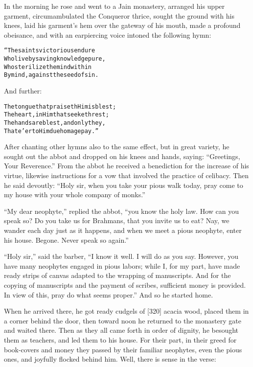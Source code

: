\documentclass{article}
\renewenvironment{verbatim}{\begin{alltt}\normalfont\begin{centering}}{\end{centering}\end{alltt}}
\begin{document}
In the morning he rose and went to a Jain monastery, arranged his
upper garment, circumambulated the Conqueror thrice, sought the
ground with his knees, laid his garment's hem over the gateway of
his mouth, made a profound obeisance, and with an earpiercing voice
intoned the following hymn:

\begin{verbatim}
“The saints victorious endure
Who live by saving knowledge pure,
Who sterilize the mind within
By mind, against the seed of sin.
\end{verbatim}
And further:

\begin{verbatim}
The tongue that praiseth Him is blest;
The heart, in Him that seeketh rest;
The hands are blest, and only they,
That e'er to Him due homage pay.”
\end{verbatim}
After chanting other hymns also to the same effect, but in great
variety, he sought out the abbot and dropped on his knees and
hands, saying: ``Greetings, Your Reverence.'' From the abbot he
received a benediction for the increase of his virtue, likewise
instructions for a vow that involved the practice of celibacy. Then
he said devoutly:
``Holy sir, when you take your pious walk today, pray come to my house with your whole company of monks.''

``My dear neophyte,'' replied the abbot,
``you know the holy law. How can you speak so? Do you take us for Brahmans, that you invite us to eat? Nay, we wander each day just as it happens, and when we meet a pious neophyte, enter his house. Begone. Never speak so again.''

``Holy sir,'' said the barber,
``I know it well. I will do as you say. However, you have many neophytes engaged in pious labors; while I, for my part, have made ready strips of canvas adapted to the wrapping of manuscripts. And for the copying of manuscripts and the payment of scribes, sufficient money is provided. In view of this, pray do what seems proper.''
And so he started home.

When he arrived there, he got ready cudgels of [320] acacia wood,
placed them in a corner behind the door, then toward noon he
returned to the monastery gate and waited there. Then as they all
came forth in order of dignity, he besought them as teachers, and
led them to his house. For their part, in their greed for
book-covers and money they passed by their familiar neophytes, even
the pious ones, and joyfully flocked behind him. Well, there is
sense in the verse:
\end{document}

